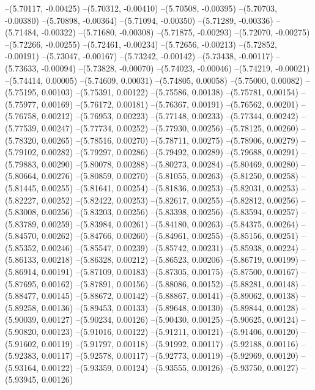 --(5.70117, -0.00425)
--(5.70312, -0.00410)
--(5.70508, -0.00395)
--(5.70703, -0.00380)
--(5.70898, -0.00364)
--(5.71094, -0.00350)
--(5.71289, -0.00336)
--(5.71484, -0.00322)
--(5.71680, -0.00308)
--(5.71875, -0.00293)
--(5.72070, -0.00275)
--(5.72266, -0.00255)
--(5.72461, -0.00234)
--(5.72656, -0.00213)
--(5.72852, -0.00191)
--(5.73047, -0.00167)
--(5.73242, -0.00142)
--(5.73438, -0.00117)
--(5.73633, -0.00094)
--(5.73828, -0.00070)
--(5.74023, -0.00046)
--(5.74219, -0.00021)
--(5.74414, 0.00005)
--(5.74609, 0.00031)
--(5.74805, 0.00058)
--(5.75000, 0.00082)
--(5.75195, 0.00103)
--(5.75391, 0.00122)
--(5.75586, 0.00138)
--(5.75781, 0.00154)
--(5.75977, 0.00169)
--(5.76172, 0.00181)
--(5.76367, 0.00191)
--(5.76562, 0.00201)
--(5.76758, 0.00212)
--(5.76953, 0.00223)
--(5.77148, 0.00233)
--(5.77344, 0.00242)
--(5.77539, 0.00247)
--(5.77734, 0.00252)
--(5.77930, 0.00256)
--(5.78125, 0.00260)
--(5.78320, 0.00265)
--(5.78516, 0.00270)
--(5.78711, 0.00275)
--(5.78906, 0.00279)
--(5.79102, 0.00282)
--(5.79297, 0.00286)
--(5.79492, 0.00289)
--(5.79688, 0.00291)
--(5.79883, 0.00290)
--(5.80078, 0.00288)
--(5.80273, 0.00284)
--(5.80469, 0.00280)
--(5.80664, 0.00276)
--(5.80859, 0.00270)
--(5.81055, 0.00263)
--(5.81250, 0.00258)
--(5.81445, 0.00255)
--(5.81641, 0.00254)
--(5.81836, 0.00253)
--(5.82031, 0.00253)
--(5.82227, 0.00252)
--(5.82422, 0.00253)
--(5.82617, 0.00255)
--(5.82812, 0.00256)
--(5.83008, 0.00256)
--(5.83203, 0.00256)
--(5.83398, 0.00256)
--(5.83594, 0.00257)
--(5.83789, 0.00259)
--(5.83984, 0.00261)
--(5.84180, 0.00263)
--(5.84375, 0.00264)
--(5.84570, 0.00262)
--(5.84766, 0.00260)
--(5.84961, 0.00255)
--(5.85156, 0.00251)
--(5.85352, 0.00246)
--(5.85547, 0.00239)
--(5.85742, 0.00231)
--(5.85938, 0.00224)
--(5.86133, 0.00218)
--(5.86328, 0.00212)
--(5.86523, 0.00206)
--(5.86719, 0.00199)
--(5.86914, 0.00191)
--(5.87109, 0.00183)
--(5.87305, 0.00175)
--(5.87500, 0.00167)
--(5.87695, 0.00162)
--(5.87891, 0.00156)
--(5.88086, 0.00152)
--(5.88281, 0.00148)
--(5.88477, 0.00145)
--(5.88672, 0.00142)
--(5.88867, 0.00141)
--(5.89062, 0.00138)
--(5.89258, 0.00136)
--(5.89453, 0.00133)
--(5.89648, 0.00130)
--(5.89844, 0.00128)
--(5.90039, 0.00127)
--(5.90234, 0.00126)
--(5.90430, 0.00125)
--(5.90625, 0.00124)
--(5.90820, 0.00123)
--(5.91016, 0.00122)
--(5.91211, 0.00121)
--(5.91406, 0.00120)
--(5.91602, 0.00119)
--(5.91797, 0.00118)
--(5.91992, 0.00117)
--(5.92188, 0.00116)
--(5.92383, 0.00117)
--(5.92578, 0.00117)
--(5.92773, 0.00119)
--(5.92969, 0.00120)
--(5.93164, 0.00122)
--(5.93359, 0.00124)
--(5.93555, 0.00126)
--(5.93750, 0.00127)
--(5.93945, 0.00126)
